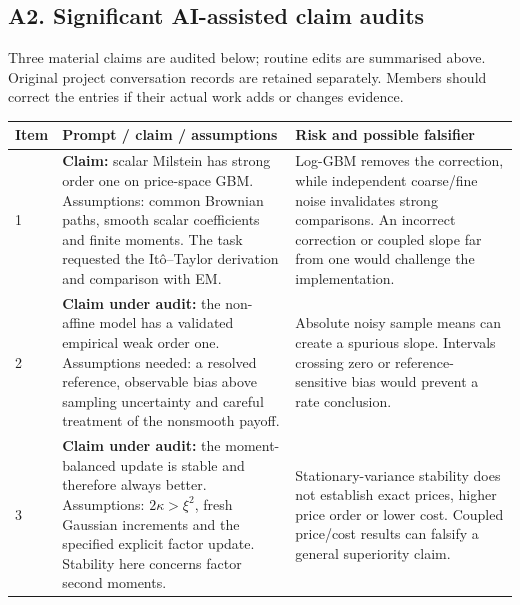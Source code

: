 \subsection*{A2. Significant AI-assisted claim audits}
Three material claims are audited below; routine edits are summarised above. Original project conversation records are retained separately. Members should correct the entries if their actual work adds or changes evidence.
\begingroup\small\setlength{\tabcolsep}{4pt}
\begin{longtable}{@{}p{.06\linewidth}p{.46\linewidth}p{.43\linewidth}@{}}\toprule
Item & Prompt / claim / assumptions & Risk and possible falsifier\\\midrule\endhead
1 & \textbf{Claim:} scalar Milstein has strong order one on price-space GBM. Assumptions: common Brownian paths, smooth scalar coefficients and finite moments. The task requested the It\^o--Taylor derivation and comparison with EM. & Log-GBM removes the correction, while independent coarse/fine noise invalidates strong comparisons. An incorrect correction or coupled slope far from one would challenge the implementation.\\[10pt]
2 & \textbf{Claim under audit:} the non-affine model has a validated empirical weak order one. Assumptions needed: a resolved reference, observable bias above sampling uncertainty and careful treatment of the nonsmooth payoff. & Absolute noisy sample means can create a spurious slope. Intervals crossing zero or reference-sensitive bias would prevent a rate conclusion.\\[10pt]
3 & \textbf{Claim under audit:} the moment-balanced update is stable and therefore always better. Assumptions: $2\kappa>\xi^2$, fresh Gaussian increments and the specified explicit factor update. Stability here concerns factor second moments. & Stationary-variance stability does not establish exact prices, higher price order or lower cost. Coupled price/cost results can falsify a general superiority claim.\\\bottomrule
\end{longtable}\endgroup

